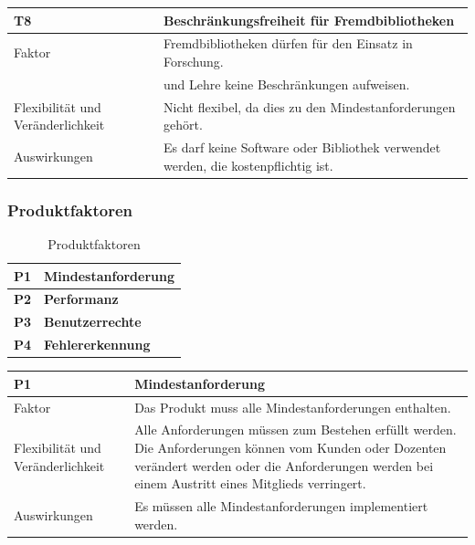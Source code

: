 \documentclass[fontsize=12pt,paper=a4,twoside]{scrartcl}
\begin{document}
\begin{table}[H]
\begin{tabular}{|p{3cm}|p{12cm}|}\hline
\textbf{T8} & \textbf{Beschränkungsfreiheit für Fremdbibliotheken}\\ \hline \hline
Faktor & Fremdbibliotheken dürfen für den Einsatz in Forschung.\\
& und Lehre keine Beschränkungen aufweisen. \\ \hline
Flexibilität und Veränderlichkeit & Nicht flexibel, da dies zu den Mindestanforderungen gehört.\\ \hline
Auswirkungen & Es darf keine Software oder Bibliothek verwendet werden, die kostenpflichtig ist. \\ \hline
\end{tabular}
\end{table}

\subsubsection{Produktfaktoren}
\label{sec:produktfaktoren}

\begin{table}[H]
\centering
\caption{Produktfaktoren}
\begin{tabular}{|l|l|} \hline
\textbf{P1} & \textbf{Mindestanforderung} \\ \hline
\textbf{P2} &  \textbf{Performanz}\\ \hline
\textbf{P3} &  \textbf{Benutzerrechte} \\ \hline
\textbf{P4} &  \textbf{Fehlererkennung} \\ \hline
\end{tabular}
\end{table}

\begin{table}[H]
\begin{tabular}{|p{3cm}|p{12cm}|}\hline
\textbf{P1} & \textbf{Mindestanforderung} \\ \hline \hline
Faktor & Das Produkt muss alle Mindestanforderungen enthalten.\\ \hline
Flexibilität und Veränderlichkeit & Alle Anforderungen müssen zum Bestehen erfüllt werden. Die Anforderungen können vom Kunden oder Dozenten verändert werden oder die Anforderungen werden bei einem Austritt eines Mitglieds verringert.\\ \hline
Auswirkungen & Es müssen alle Mindestanforderungen implementiert werden. \\ \hline
\end{tabular}
\end{table}
\end{document}
